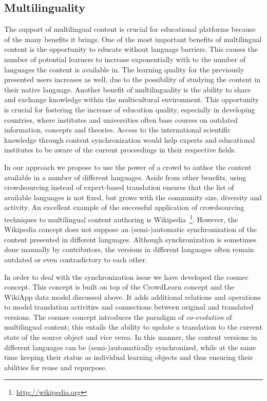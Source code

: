 \documentclass[PhD, Submit, ngerman,UKenglish,table]{scrbook}
\begin{document}
\subsection{Multilinguality}

The support of multilingual content is crucial for educational platforms because of the many benefits it brings. %
One of the most important benefits of multilingual content is the opportunity to educate without language barriers.
This causes the number of potential learners to increase exponentially with to the number of languages the content is available in.
The learning quality for the previously presented users increases as well, due to the possibility of studying the content in their native language.
Another benefit of multilinguality is the ability to share and exchange knowledge within the multicultural environment.
This opportunity is crucial for fostering the increase of  education quality, especially in developing countries, where institutes and universities often base courses on outdated information, concepts and theories.
Access to the international scientific knowledge through content synchronization would help experts and educational institutes to be aware of  the current proceedings in their respective fields.

In our approach we propose to use the power of a crowd to author the content available in a number of different languages. 
Aside from other benefits, using crowdsourcing instead of expert-based translation ensures that the list of available languages is not fixed, but grows with the community size, diversity and activity.
An excellent example of the successful application of crowdsourcing techniques to multilingual content authoring is Wikipedia~\footnote{\url{http://wikipedia.org}}.
However, the Wikipedia concept does not suppose an (semi-)automatic synchronization of the content presented in different languages.
Although  synchronization is sometimes done manually by contributors, the versions in different languages often remain outdated or even contradictory to each other.

In order to deal with the synchronization issue we have developed the \gls{cosmec} concept.
This concept is built on top of the CrowdLearn concept and the WikiApp data model discussed above.
It adds additional relations and operations to model translation activities and connections between original and translated versions.
The \gls{cosmec} concept introduces the paradigm of \emph{co-evolution} of multilingual content; this entails the ability to update a translation to the current state of the source object and vice versa. 
In this manner, the content versions in different languages can be (semi-)automatically synchronized, while at the same time keeping their status as individual learning objects and thus ensuring their abilities for reuse and repurpose. 
\end{document}
